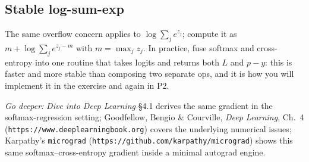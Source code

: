 \subsection*{Stable log-sum-exp}
The same overflow concern applies to $\log\sum_j e^{z_j}$; compute it as
$m + \log\sum_j e^{z_j-m}$ with $m=\max_j z_j$. In practice, fuse softmax and
cross-entropy into one routine that takes logits and returns both $L$ and
$p-y$: this is faster and more stable than composing two separate ops, and it is
how you will implement it in the exercise and again in P2.

\medskip
\noindent\textit{Go deeper:} \emph{Dive into Deep Learning} §4.1 derives the same
gradient in the softmax-regression setting; Goodfellow, Bengio \& Courville,
\emph{Deep Learning}, Ch.~4 (\texttt{https://www.deeplearningbook.org}) covers
the underlying numerical issues; Karpathy's \texttt{micrograd}
(\texttt{https://github.com/karpathy/micrograd}) shows this same
softmax--cross-entropy gradient inside a minimal autograd engine.
